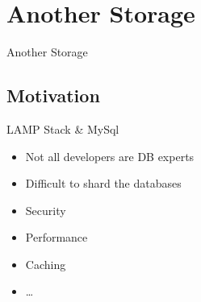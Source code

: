 \documentclass[aspectratio=169]{beamer}
\begin{document}
\section{Another Storage}

{
\begin{frame}{Another Storage}
\end{frame}
}

\subsection{Motivation}

\begin{frame}{LAMP Stack \& MySql}
    \begin{itemize}
        \item Not all developers are DB experts
        \item Difficult to shard the databases
        \item Security
        \item Performance
        \item Caching
        \item \dots
    \end{itemize}
\end{frame}
\end{document}

